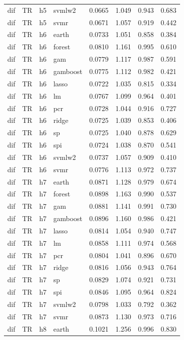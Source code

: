 \begin{ThreePartTable}
\begin{longtable}[t]{llclcccc}
dif & TR & h5 & svmlw2 & 0.0665 & 1.049 & 0.943 & 0.683\\
dif & TR & h5 & svmr & 0.0671 & 1.057 & 0.919 & 0.442\\
\addlinespace
dif & TR & h6 & earth & 0.0733 & 1.051 & 0.858 & 0.384\\
dif & TR & h6 & forest & 0.0810 & 1.161 & 0.995 & 0.610\\
dif & TR & h6 & gam & 0.0779 & 1.117 & 0.987 & 0.591\\
dif & TR & h6 & gamboost & 0.0775 & 1.112 & 0.982 & 0.421\\
dif & TR & h6 & lasso & 0.0722 & 1.035 & 0.815 & 0.334\\
dif & TR & h6 & lm & 0.0767 & 1.099 & 0.964 & 0.401\\
dif & TR & h6 & pcr & 0.0728 & 1.044 & 0.916 & 0.727\\
dif & TR & h6 & ridge & 0.0725 & 1.039 & 0.853 & 0.406\\
dif & TR & h6 & sp & 0.0725 & 1.040 & 0.878 & 0.629\\
dif & TR & h6 & spi & 0.0724 & 1.038 & 0.870 & 0.541\\
dif & TR & h6 & svmlw2 & 0.0737 & 1.057 & 0.909 & 0.410\\
dif & TR & h6 & svmr & 0.0776 & 1.113 & 0.972 & 0.737\\
\addlinespace
dif & TR & h7 & earth & 0.0871 & 1.128 & 0.979 & 0.674\\
dif & TR & h7 & forest & 0.0898 & 1.163 & 0.990 & 0.537\\
dif & TR & h7 & gam & 0.0881 & 1.141 & 0.991 & 0.730\\
dif & TR & h7 & gamboost & 0.0896 & 1.160 & 0.986 & 0.421\\
dif & TR & h7 & lasso & 0.0814 & 1.054 & 0.940 & 0.747\\
dif & TR & h7 & lm & 0.0858 & 1.111 & 0.974 & 0.568\\
dif & TR & h7 & pcr & 0.0804 & 1.041 & 0.896 & 0.670\\
dif & TR & h7 & ridge & 0.0816 & 1.056 & 0.943 & 0.764\\
dif & TR & h7 & sp & 0.0829 & 1.074 & 0.921 & 0.731\\
dif & TR & h7 & spi & 0.0846 & 1.095 & 0.964 & 0.824\\
dif & TR & h7 & svmlw2 & 0.0798 & 1.033 & 0.792 & 0.362\\
dif & TR & h7 & svmr & 0.0873 & 1.130 & 0.973 & 0.716\\
\addlinespace
dif & TR & h8 & earth & 0.1021 & 1.256 & 0.996 & 0.830\\

\end{longtable}
\end{ThreePartTable}
